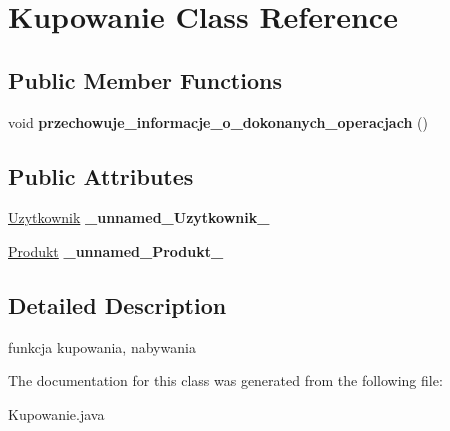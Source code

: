 \hypertarget{class_kupowanie}{\section{Kupowanie Class Reference}
\label{class_kupowanie}
}
\subsection*{Public Member Functions}
\begin{DoxyCompactItemize}
\item 
\hypertarget{class_kupowanie_a8c07705c7fee136fb9445de31a876a06}{void {\bfseries przechowuje\+\_\+informacje\+\_\+o\+\_\+dokonanych\+\_\+operacjach} ()}\label{class_kupowanie_a8c07705c7fee136fb9445de31a876a06}

\end{DoxyCompactItemize}
\subsection*{Public Attributes}
\begin{DoxyCompactItemize}
\item 
\hypertarget{class_kupowanie_af6c8a937759ba60b08c93b8ea64271f5}{\hyperlink{class_uzytkownik}{Uzytkownik} {\bfseries \+\_\+unnamed\+\_\+\+Uzytkownik\+\_\+}}\label{class_kupowanie_af6c8a937759ba60b08c93b8ea64271f5}

\item 
\hypertarget{class_kupowanie_a0d693a5cda1b2f9c9df43a873c6cb32a}{\hyperlink{class_produkt}{Produkt} {\bfseries \+\_\+unnamed\+\_\+\+Produkt\+\_\+}}\label{class_kupowanie_a0d693a5cda1b2f9c9df43a873c6cb32a}

\end{DoxyCompactItemize}


\subsection{Detailed Description}
funkcja kupowania, nabywania 

The documentation for this class was generated from the following file\+:\begin{DoxyCompactItemize}
\item 
Kupowanie.\+java\end{DoxyCompactItemize}
